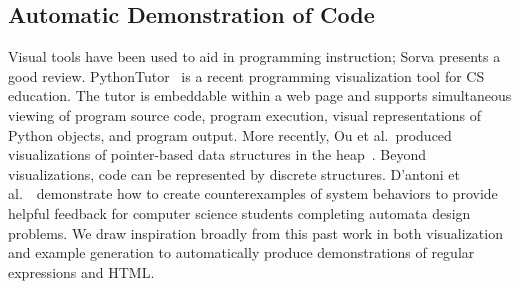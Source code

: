 \subsection{Automatic Demonstration of Code}

Visual tools have been used to aid in programming instruction; Sorva \cite{sorva_visual_2012} presents a good review.
PythonTutor~\cite{guo_online_2013} is a recent programming visualization tool for CS education.
The tutor is embeddable within a web page and supports simultaneous viewing of program source code, program execution, visual representations of Python objects, and program output.
More recently, Ou et al.\ produced visualizations of pointer-based data structures in the heap~\cite{ou_interactive_2015}.
Beyond visualizations, code can be represented by discrete structures.
D'antoni et al.~\cite{dantoni_how_2015}\ demonstrate how to create counterexamples of system behaviors to provide helpful feedback for computer science students completing automata design problems.
We draw inspiration broadly from this past work in both visualization and example generation to automatically produce demonstrations of regular expressions and HTML\@.
